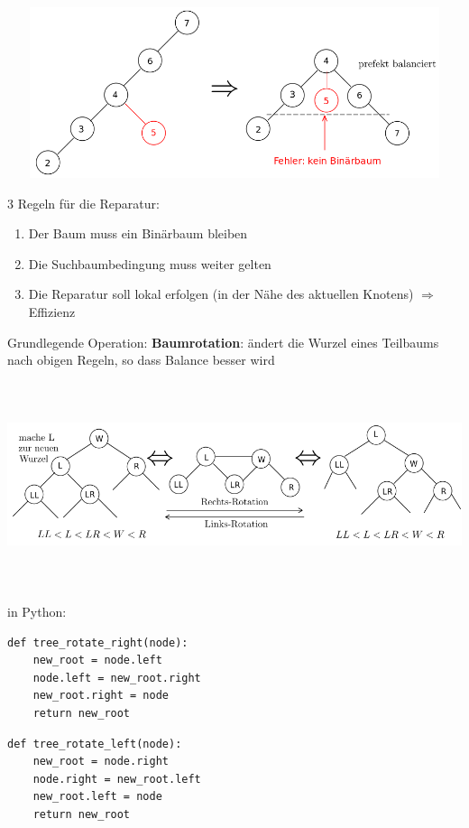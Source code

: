 \documentclass[11pt, fleqn]{scrreprt}
\begin{document}
\includegraphics[width=15cm,height=5cm,keepaspectratio]{./Pictures/Reparatur.png}

3 Regeln für die Reparatur:
\begin{enumerate}
    \item Der Baum muss ein Binärbaum bleiben
    \item Die Suchbaumbedingung muss weiter gelten
    \item Die Reparatur soll lokal erfolgen (in der Nähe des aktuellen Knotens) $\Rightarrow$ Effizienz
\end{enumerate}

Grundlegende Operation: \textbf{Baumrotation}: ändert die Wurzel eines Teilbaums nach obigen Regeln, so dass Balance besser wird

\includegraphics[width=16cm,height=6cm,keepaspectratio]{./Pictures/Rotation.png}

in Python:
\begin{verbatim}
def tree_rotate_right(node):
    new_root = node.left
    node.left = new_root.right
    new_root.right = node
    return new_root
\end{verbatim}

\begin{verbatim}
def tree_rotate_left(node):
    new_root = node.right
    node.right = new_root.left
    new_root.left = node
    return new_root
\end{verbatim}
\end{document}
